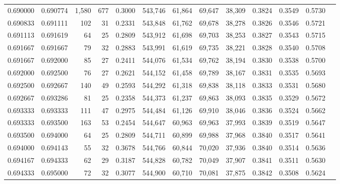 \begin{tabular}{rrrrrrrrrrrrr}
0.690000 & 0.690774 & 1,580 & 677 &                                     0.3000 & 543,746 &  61,864 &  69,647 &  38,309 & 0.3824 & 0.3549 & 0.5730 \\
0.690833 & 0.691111 &   102 &  31 &                                     0.2331 & 543,848 &  61,762 &  69,678 &  38,278 & 0.3826 & 0.3546 & 0.5721 \\
0.691113 & 0.691619 &    64 &  25 &                                     0.2809 & 543,912 &  61,698 &  69,703 &  38,253 & 0.3827 & 0.3543 & 0.5715 \\
0.691667 & 0.691667 &    79 &  32 &                                     0.2883 & 543,991 &  61,619 &  69,735 &  38,221 & 0.3828 & 0.3540 & 0.5708 \\
0.691667 & 0.692000 &    85 &  27 &                                     0.2411 & 544,076 &  61,534 &  69,762 &  38,194 & 0.3830 & 0.3538 & 0.5700 \\
0.692000 & 0.692500 &    76 &  27 &                                     0.2621 & 544,152 &  61,458 &  69,789 &  38,167 & 0.3831 & 0.3535 & 0.5693 \\
0.692500 & 0.692667 &   140 &  49 &                                     0.2593 & 544,292 &  61,318 &  69,838 &  38,118 & 0.3833 & 0.3531 & 0.5680 \\
0.692667 & 0.693286 &    81 &  25 &                                     0.2358 & 544,373 &  61,237 &  69,863 &  38,093 & 0.3835 & 0.3529 & 0.5672 \\
0.693333 & 0.693333 &   111 &  47 &                                     0.2975 & 544,484 &  61,126 &  69,910 &  38,046 & 0.3836 & 0.3524 & 0.5662 \\
0.693333 & 0.693500 &   163 &  53 &                                     0.2454 & 544,647 &  60,963 &  69,963 &  37,993 & 0.3839 & 0.3519 & 0.5647 \\
0.693500 & 0.694000 &    64 &  25 &                                     0.2809 & 544,711 &  60,899 &  69,988 &  37,968 & 0.3840 & 0.3517 & 0.5641 \\
0.694000 & 0.694143 &    55 &  32 &                                     0.3678 & 544,766 &  60,844 &  70,020 &  37,936 & 0.3840 & 0.3514 & 0.5636 \\
0.694167 & 0.694333 &    62 &  29 &                                     0.3187 & 544,828 &  60,782 &  70,049 &  37,907 & 0.3841 & 0.3511 & 0.5630 \\
0.694333 & 0.695000 &    72 &  32 &                                     0.3077 & 544,900 &  60,710 &  70,081 &  37,875 & 0.3842 & 0.3508 & 0.5624 \\

\end{tabular}
